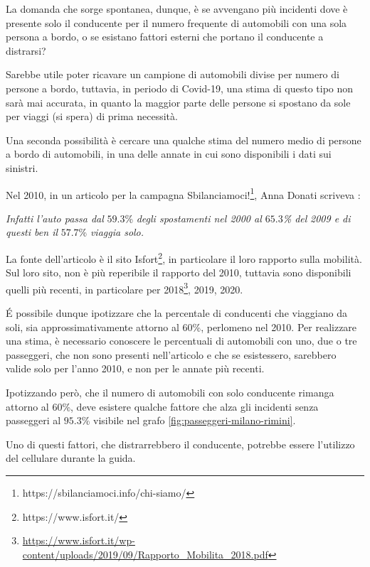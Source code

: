\documentclass[a4paper,12pt]{report}
\newcommand{\quotestyle}[1]{\textit{#1}}
\begin{document}
La domanda che sorge spontanea, dunque, è se avvengano più incidenti dove è presente 
solo il conducente per il numero frequente di automobili con una sola persona a 
bordo, o se esistano fattori esterni che portano il conducente a distrarsi?

Sarebbe utile poter ricavare un campione di automobili divise per 
numero di persone a bordo, tuttavia, in periodo di Covid-19, una stima di questo tipo 
non sarà mai accurata, in quanto la maggior parte delle persone si spostano da sole 
per viaggi (si spera) di prima necessità.

Una seconda possibilità è cercare una qualche stima del numero medio di 
persone a bordo di automobili, in una delle annate in cui sono disponibili i dati 
sui sinistri.

Nel 2010, in un articolo per la campagna 
Sbilanciamoci!\footnote{https://sbilanciamoci.info/chi-siamo/}, 
Anna Donati scriveva \cite{SBILANCIAMOCI:1}: 

\begin{center}
    \quotestyle{Infatti l’auto passa dal} $59.3$\% \quotestyle{degli spostamenti nel 2000 al $65.3$\% del }
    \quotestyle{2009 e di questi ben il} $57.7$\% 
    \quotestyle{viaggia solo.}
\end{center}

La fonte dell'articolo è il sito Isfort\footnote{https://www.isfort.it/}, 
in particolare il loro rapporto sulla mobilità.
Sul loro sito, non è più reperibile il rapporto del 2010, tuttavia sono disponibili 
quelli più recenti, in particolare per 
2018\footnote{\url{https://www.isfort.it/wp-content/uploads/2019/09/Rapporto_Mobilita_2018.pdf}}, 
2019, 2020.

\'E possibile dunque ipotizzare che la percentale di conducenti che viaggiano 
da soli, sia approssimativamente attorno al $60$\%, perlomeno nel 2010.
Per realizzare una stima, è necessario conoscere le percentuali di automobili con uno, 
due o tre passeggeri, che non sono presenti nell'articolo e che se esistessero, sarebbero 
valide solo per l'anno 2010, e non per le annate più recenti.

Ipotizzando però, che il numero di automobili con solo conducente rimanga attorno al 
$60$\%, deve esistere qualche fattore che alza gli incidenti senza passeggeri al 
$95.3$\% visibile nel grafo \ref{fig:passeggeri-milano-rimini}.

Uno di questi fattori, che distrarrebbero il conducente, potrebbe essere l'utilizzo 
del cellulare durante la guida.
\end{document}
